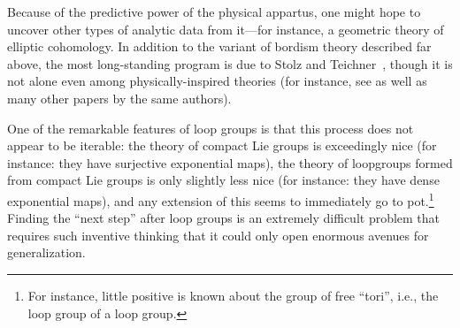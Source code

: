 Because of the predictive power of the physical appartus, one might hope to uncover other types of analytic data from it---for instance, a geometric theory of elliptic cohomology.  In addition to the variant of bordism theory described far above, the most long-standing program is due to Stolz and Teichner~\cite{StolzTeichnerWhatIs,StolzTeichnerSusy}, though it is not alone even among physically-inspired theories (for instance, see \cite{DouglasHenriques} as well as many other papers by the same authors).

One of the remarkable features of loop groups is that this process does not appear to be iterable: the theory of compact Lie groups is exceedingly nice (for instance: they have surjective exponential maps), the theory of loopgroups formed from compact Lie groups is only slightly less nice (for instance: they have dense exponential maps), and any extension of this seems to immediately go to pot.\footnote{For instance, little positive is known about the group of free ``tori'', i.e., the loop group of a loop group.}  Finding the ``next step'' after loop groups is an extremely difficult problem that requires such inventive thinking that it could only open enormous avenues for generalization.








